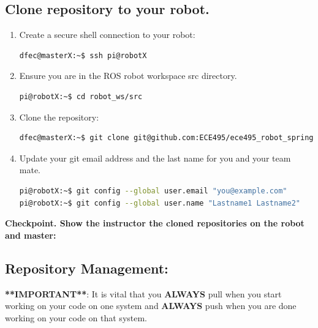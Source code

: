 \documentclass{handout}
\begin{document}
\subsection{Clone repository to your robot.}
\begin{enumerate}
	\item Create a secure shell connection to your robot:
\begin{lstlisting}[language=bash]
dfec@masterX:~$ ssh pi@robotX
\end{lstlisting}
\item Ensure you are in the ROS robot workspace src directory.
\begin{lstlisting}[language=bash]
pi@robotX:~$ cd robot_ws/src
\end{lstlisting}
	\item Clone the repository:
\begin{lstlisting}[language=bash]
dfec@masterX:~$ git clone git@github.com:ECE495/ece495_robot_spring2022-USERNAME.git
\end{lstlisting}

\item Update your git email address and the last name for you and your team mate.
\begin{lstlisting}[language=bash]
pi@robotX:~$ git config --global user.email "you@example.com"
pi@robotX:~$ git config --global user.name "Lastname1 Lastname2"
\end{lstlisting}
\end{enumerate}

\textbf{Checkpoint. Show the instructor the cloned repositories on the robot and master:}

\subsection{Repository Management:}
\textbf{**IMPORTANT**}: It is vital that you \textbf{ALWAYS} pull when you start working on your code on one system and \textbf{ALWAYS} push when you are done working on your code on that system.
\end{document}

